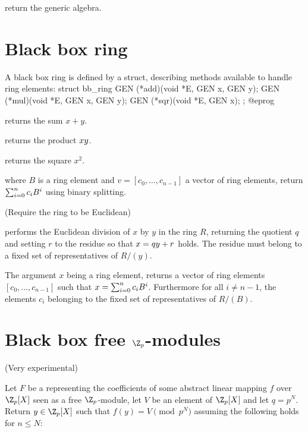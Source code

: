 return the generic algebra.

\section{Black box ring}

A black box ring is defined by a  struct, describing methods
available to handle ring elements:
\bprog
struct bb_ring
{
  GEN (*add)(void *E, GEN x, GEN y);
  GEN (*mul)(void *E, GEN x, GEN y);
  GEN (*sqr)(void *E, GEN x);
};
@eprog

 returns the sum $x+y$.

 returns the product $x\*y$.

 returns the square $x^2$.

where $B$ is a ring element and $v=[c_0,\ldots,c_{n-1}]$ a vector of ring elements,
return $\sum_{i=0}^n c_i\*B^i$ using binary splitting.


(Require the ring to be Euclidean)

 performs the Euclidean division of $x$ by $y$ in the ring
$R$, returning the quotient $q$ and setting $r$ to the residue so that
$x=q\*y+r$ holds. The residue must belong to a fixed set of representatives of
$R/(y)$.

The argument $x$ being a ring element,  returns a vector of
ring elements $[c_0,\ldots,c_{n-1}]$ such that $x = \sum_{i=0}^n c_i\*B^i$.
Furthermore for all $i\ne n-1$, the elements $c_i$ belonging to the fixed set
of representatives of $R/(B)$.

\section{Black box free $\Z_p$-modules}

(Very experimental)


Let $F$ be a  representing the coefficients of some abstract
linear mapping $f$ over $\Z_p[X]$ seen as a free $\Z_p$-module, let $V$ be
an element of $\Z_p[X]$ and let $q = p^N$.  Return $y\in\Z_p[X]$ such that
$f(y)=V\pmod{p^N}$ assuming the following holds for $n\leq N$:

